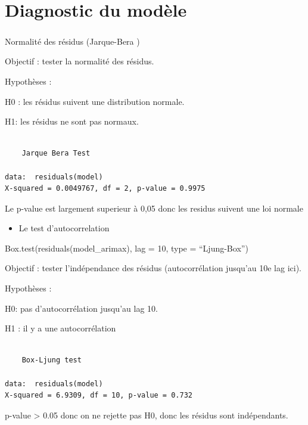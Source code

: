 \documentclass[
  letterpaper,
  DIV=11,
  numbers=noendperiod]{scrartcl}
\makeatletter
\let\oldsubparagraph\subparagraph
\renewcommand{\subparagraph}{
    \@ifstar
      \xxxSubParagraphStar
      \xxxSubParagraphNoStar
  }
\newcommand{\xxxSubParagraphStar}[1]{\oldsubparagraph*{#1}\mbox{}}
\newcommand{\xxxSubParagraphNoStar}[1]{\oldsubparagraph{#1}\mbox{}}
\providecommand{\tightlist}{%
  \setlength{\itemsep}{0pt}\setlength{\parskip}{0pt}}\usepackage{longtable,booktabs,array}
\makeatother
\begin{document}
\section{Diagnostic du modèle}\label{diagnostic-du-moduxe8le}

\subparagraph{Normalité des résidus (Jarque-Bera
)}\label{normalituxe9-des-ruxe9sidus-jarque-bera}

Objectif : tester la normalité des résidus.

Hypothèses :

H0\hspace{0pt} : les résidus suivent une distribution normale.

H1: les résidus ne sont pas normaux.

\begin{verbatim}

    Jarque Bera Test

data:  residuals(model)
X-squared = 0.0049767, df = 2, p-value = 0.9975
\end{verbatim}

Le p-value est largement superieur à 0,05 donc les residus suivent une
loi normale

\begin{itemize}
\tightlist
\item
  Le test d'autocorrelation
\end{itemize}

Box.test(residuals(model\_arimax), lag = 10, type = ``Ljung-Box'')

Objectif : tester l'indépendance des résidus (autocorrélation jusqu'au
10e lag ici).

Hypothèses :

H0: pas d'autocorrélation jusqu'au lag 10.

H1\hspace{0pt} : il y a une autocorrélation

\begin{verbatim}

    Box-Ljung test

data:  residuals(model)
X-squared = 6.9309, df = 10, p-value = 0.732
\end{verbatim}

p-value \textgreater{} 0.05 donc on ne rejette pas H0, donc les résidus
sont indépendants.
\end{document}
